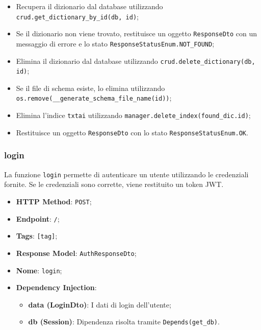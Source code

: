 \begin{itemize}
\item Recupera il dizionario dal database utilizzando \texttt{crud.get\_dictionary\_by\_id(db, id)};
\item Se il dizionario non viene trovato, restituisce un oggetto \texttt{ResponseDto} con un messaggio di errore e lo stato \texttt{ResponseStatusEnum.NOT\_FOUND};
\item Elimina il dizionario dal database utilizzando \texttt{crud.delete\_dictionary(db, id)};
\item Se il file di schema esiste, lo elimina utilizzando \texttt{os.remove(\_\_generate\_schema\-\_\-file\_name(id))};
\item Elimina l'indice \texttt{txtai} utilizzando \texttt{manager.delete\_index(found\_dic.id)};
\item Restituisce un oggetto \texttt{ResponseDto} con lo stato \texttt{ResponseStatusEnum.OK}.
\end{itemize}


\subsubsection{login}

\par La funzione \texttt{login} permette di autenticare un utente utilizzando le credenziali fornite. Se le credenziali sono corrette, viene restituito un token JWT.

\begin{itemize}
\item \textbf{HTTP Method}: \texttt{POST};
\item \textbf{Endpoint}: \texttt{/};
\item \textbf{Tags}: \texttt{[tag]};
\item \textbf{Response Model}: \texttt{AuthResponseDto};
\item \textbf{Nome}: \texttt{login};
\item \textbf{Dependency Injection}:
\begin{itemize}
\item \textbf{data (LoginDto)}: I dati di login dell'utente;
\item \textbf{db (Session)}: Dipendenza risolta tramite \texttt{Depends(get\_db)}.
\end{itemize}
\end{itemize}


